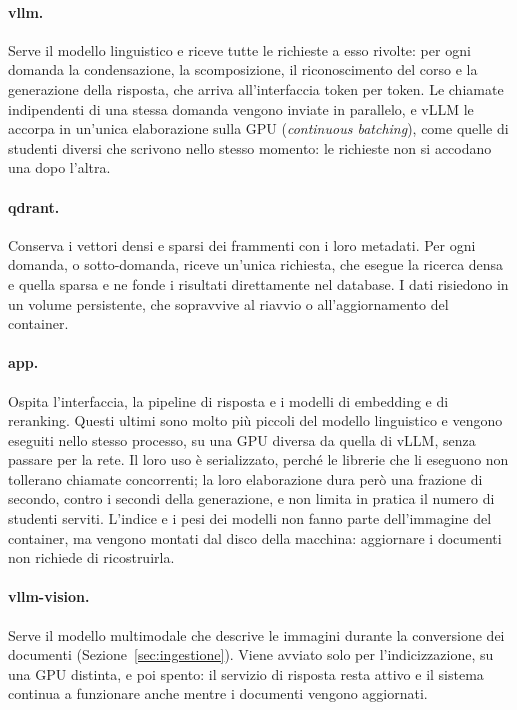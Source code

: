 \paragraph{vllm.} Serve il modello linguistico e riceve tutte le richieste a esso rivolte: per ogni domanda la
condensazione, la scomposizione, il riconoscimento del corso e la generazione della risposta, che arriva
all'interfaccia token per token. Le chiamate indipendenti di una stessa domanda vengono inviate in parallelo, e vLLM
le accorpa in un'unica elaborazione sulla GPU (\emph{continuous batching}), come quelle di studenti diversi che
scrivono nello stesso momento: le richieste non si accodano una dopo l'altra.

\paragraph{qdrant.} Conserva i vettori densi e sparsi dei frammenti con i loro metadati. Per ogni domanda, o
sotto-domanda, riceve un'unica richiesta, che esegue la ricerca densa e quella sparsa e ne fonde i risultati direttamente nel database.
I dati risiedono in un volume persistente, che sopravvive al riavvio o all'aggiornamento del container.

\paragraph{app.} Ospita l'interfaccia, la pipeline di risposta e i modelli di embedding e di reranking. Questi ultimi
sono molto più piccoli del modello linguistico e vengono eseguiti nello stesso processo, su una GPU diversa da
quella di vLLM, senza
passare per la rete. Il loro uso è serializzato, perché le librerie che li eseguono non tollerano chiamate
concorrenti; la loro elaborazione dura però una frazione di secondo, contro i secondi della generazione, e non
limita in pratica il numero di studenti serviti. L'indice e i pesi dei modelli non fanno parte dell'immagine del
container, ma vengono montati dal disco della macchina: aggiornare i documenti non richiede di ricostruirla.

\paragraph{vllm-vision.} Serve il modello multimodale che descrive le immagini durante la conversione dei documenti
(Sezione~\ref{sec:ingestione}). Viene avviato solo per l'indicizzazione, su una GPU distinta, e poi spento: il
servizio di risposta resta attivo e il sistema continua a funzionare anche mentre i documenti vengono aggiornati.

